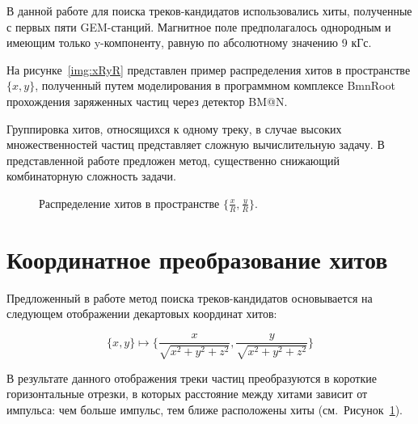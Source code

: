 \documentclass[a4paper, 12pt]{extreport}  %
\begin{document}
В данной работе для поиска треков-кандидатов использовались хиты, полученные с 
первых пяти GEM-станций. Магнитное поле предполагалось однородным и имеющим
только y-компоненту, равную по абсолютному значению 9 кГс.

На рисунке~\ref{img:xRyR} представлен пример распределения хитов в
пространстве $\{x, y\}$, полученный путем моделирования в программном комплексе
BmnRoot~\cite{bmnroot} прохождения заряженных частиц через детектор BM@N. 

Группировка хитов, относящихся к одному треку, в случае высоких множественностей
частиц представляет сложную вычислительную задачу. В представленной работе
предложен метод, существенно снижающий комбинаторную сложность задачи.

\begin{figure}[h!]
\caption{Распределение хитов в пространстве $\{\frac{x}{R}, \frac{y}{R}\}$.}
\label{img:xRyR1}
\end{figure}

\section*{Координатное преобразование хитов} 

Предложенный в работе метод поиска треков-кандидатов основывается на следующем
отображении декартовых координат хитов:

$$\{x, y\} \longmapsto \{\frac{x}{\sqrt{x^2 + y^2 + z^2}}, \frac{y}{\sqrt{x^2 +
y^2 + z^2}}\}$$

В результате данного отображения треки частиц преобразуются в короткие
горизонтальные отрезки, в которых расстояние между хитами зависит от импульса:
чем больше импульс, тем ближе расположены хиты (см.~Рисунок~\ref{img:xRyR1}).
\end{document}
